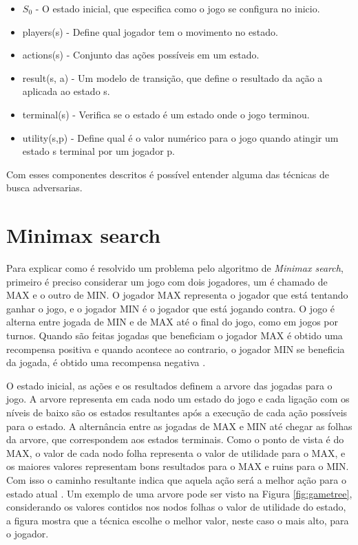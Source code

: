 \begin{itemize}
	\item $S_{0}$ - O estado inicial, que especifica como o jogo se configura no inicio.
	\item players(s) -  Define qual jogador tem o movimento no estado.
	\item actions(s) - Conjunto das ações possíveis em um estado.
	\item result(s, a) - Um modelo de transição, que define o resultado da ação a aplicada ao estado s.
	\item terminal(s) - Verifica se o estado é um estado onde o jogo terminou.
	\item utility(s,p) - Define qual é o valor numérico para o jogo quando atingir um estado s terminal por um jogador p. 
\end{itemize}

Com esses componentes descritos é possível entender alguma das técnicas de busca adversarias. 

\section{Minimax search}

Para explicar como é resolvido um problema pelo algoritmo de \textit{Minimax search}, primeiro é preciso considerar um jogo com dois jogadores, um é chamado de MAX e o outro de MIN. O jogador MAX representa o jogador que está tentando ganhar o jogo, e o jogador MIN é o jogador que está jogando contra. O jogo é alterna entre jogada de MIN e de MAX até o final do jogo, como em jogos por turnos. Quando são feitas jogadas que beneficiam o jogador MAX é obtido uma recompensa positiva e quando acontece ao contrario, o jogador MIN se beneficia da jogada, é obtido uma recompensa negativa \cite{intelligence2003modern}.
 
O estado inicial, as ações e os resultados definem a arvore das jogadas para o jogo. A arvore representa em cada nodo um estado do jogo e cada ligação com os níveis de baixo são os estados resultantes após a execução de cada ação possíveis para o estado. A alternância entre as jogadas de MAX e MIN até chegar as folhas da arvore, que correspondem aos estados terminais. Como o ponto de vista é do MAX, o valor de cada nodo folha representa o valor de utilidade para o MAX, e os maiores valores representam bons resultados para o MAX e ruins para o MIN. Com isso o caminho resultante indica que aquela ação será a melhor ação para o estado atual \cite{intelligence2003modern}. Um exemplo de uma arvore pode ser visto na Figura \ref{fig:gametree}, considerando os valores contidos nos nodos folhas o valor de utilidade do estado, a figura mostra que a técnica escolhe o melhor valor, neste caso o mais alto, para o jogador. 

